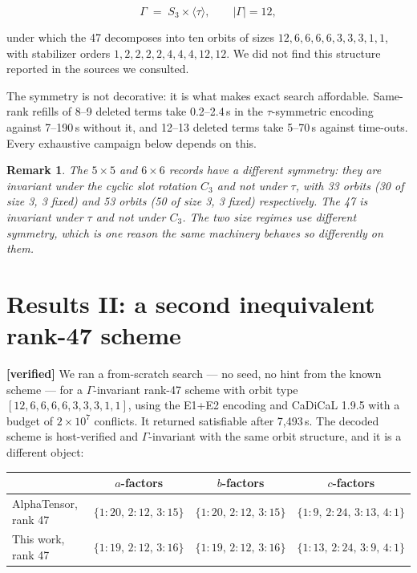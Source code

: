 \documentclass[11pt]{article}
\newtheorem{remark}{Remark}
\begin{document}
\[
\Gamma \;=\; S_3 \times \langle\tau\rangle, \qquad |\Gamma| = 12 ,
\]

under which the 47 decomposes into ten orbits of sizes $12,6,6,6,6,3,3,3,1,1$, with stabilizer orders
$1,2,2,2,2,4,4,4,12,12$. We did not find this structure reported in the sources we consulted.

The symmetry is not decorative: it is what makes exact search affordable. Same-rank refills of 8--9
deleted terms take 0.2--2.4\,s in the $\tau$-symmetric encoding against 7--190\,s without it, and 12--13
deleted terms take 5--70\,s against time-outs. Every exhaustive campaign below depends on this.

\begin{remark}
The $5\times5$ and $6\times6$ records have a \emph{different} symmetry: they are invariant under the
cyclic slot rotation $C_3$ and not under $\tau$, with 33 orbits (30 of size 3, 3 fixed) and 53 orbits (50
of size 3, 3 fixed) respectively. The 47 is invariant under $\tau$ and not under $C_3$. The two size
regimes use different symmetry, which is one reason the same machinery behaves so differently on them.
\end{remark}

\section{Results II: a second inequivalent rank-47 scheme}
\label{sec:second47}

\textbf{[verified]} We ran a from-scratch search --- no seed, no hint from the known scheme --- for a
$\Gamma$-invariant rank-47 scheme with orbit type $[12,6,6,6,6,3,3,3,1,1]$, using the E1+E2 encoding and
CaDiCaL 1.9.5 with a budget of $2\times10^{7}$ conflicts. It returned satisfiable after 7{,}493\,s. The
decoded scheme is host-verified and $\Gamma$-invariant with the same orbit structure, and it is a
different object:

\begin{center}
\begin{tabular}{lccc}
\toprule
 & $a$-factors & $b$-factors & $c$-factors \\
\midrule
AlphaTensor, rank 47 & $\{1{:}20,\,2{:}12,\,3{:}15\}$ & $\{1{:}20,\,2{:}12,\,3{:}15\}$ & $\{1{:}9,\,2{:}24,\,3{:}13,\,4{:}1\}$ \\
This work, rank 47   & $\{1{:}19,\,2{:}12,\,3{:}16\}$ & $\{1{:}19,\,2{:}12,\,3{:}16\}$ & $\{1{:}13,\,2{:}24,\,3{:}9,\,4{:}1\}$ \\
\bottomrule
\end{tabular}
\end{center}
\end{document}
